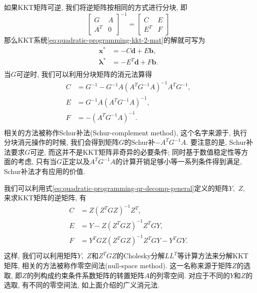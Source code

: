 \documentclass{SBCbookchapter}
\newcommand{\V}[1]{{\bm{#1}}}
\numberwithin{equation}{section}
\begin{document}
如果KKT矩阵可逆, 我们将逆矩阵按相同的方式进行分块, 即
\begin{equation}
\label{eq:quadratic-programming-kkt-inverse}
\begin{bmatrix} G & A \\ A^T & 0 \end{bmatrix}^{-1} = \begin{bmatrix} C & E \\ E^T & F \end{bmatrix}
\end{equation}
那么KKT系统\eqref{eq:quadratic-programming-kkt-2-mat}的解就可写为
\begin{equation}
\label{eq:quadratic-programming-kkt-sol-1}
\begin{aligned}
\V{x}^* & = - C \V{d} + E \V{b}, \\
\V{\lambda}^* & = - E^T \V{d} + F \V{b}. \\
\end{aligned}
\end{equation}
当$G$可逆时, 我们可以利用分块矩阵的消元法算得
\begin{equation}
\label{eq:quadratic-programming-kkt-inv-1}
\begin{aligned}
C & = G^{-1} - G^{-1} A \left( A^TG^{-1}A \right)^{-1} A^T G^{-1},\\
E & = G^{-1} A \left( A^TG^{-1}A \right)^{-1},\\
F & = - \left( A^TG^{-1}A \right)^{-1}.\\
\end{aligned}
\end{equation}
相关的方法被称作Schur补法(Schur-complement method), 这个名字来源于, 执行分块消元操作的时候, 我们会得到矩阵$G$的Schur补$-A^TG^{-1}A.$ 要注意的是, Schur补法要求$G$可逆, 而这并不是KKT矩阵非奇异的必要条件; 同时基于数值稳定性等方面的考虑, 只有当$G$正定以及$A^TG^{-1}A$的计算开销足够小等一系列条件得到满足, Schur补法才有应用的价值.

我们可以利用式\eqref{eq:quadratic-programming-qr-decomp-general}定义的矩阵$Y,$ $Z$, 来求KKT矩阵的逆矩阵, 有
\begin{equation}
\label{eq:quadratic-programming-kkt-inv-2}
\begin{aligned}
C & = Z \left( Z^T G Z \right)^{-1} Z^T,\\
E & = Y - Z \left( Z^T G Z \right)^{-1} Z^T G Y,\\
F & = Y^T G Z \left( Z^T G Z \right)^{-1} Z^T G Y - Y^T G Y.\\
\end{aligned}
\end{equation}
这样, 我们可以利用矩阵$Y,$ $Z$和$Z^T G Z$的Cholesky分解$L L^T$等计算方法来分解KKT矩阵, 相关的方法被称作零空间法(null-space method). 这一名称来源于矩阵$Z$的选取, 即$Z$的列构成约束条件系数矩阵的转置矩阵$A$的列零空间. 对应于不同的$Y$和$Z$的选取, 有不同的零空间法, 如上面介绍的广义消元法.
\end{document}
